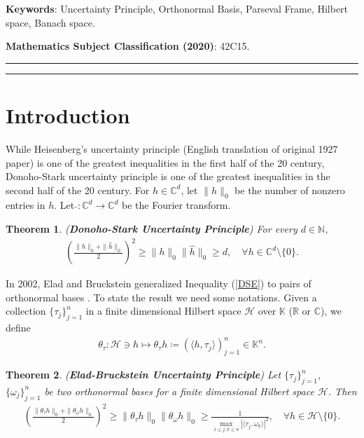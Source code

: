 \documentclass{amsart}
\newtheorem{theorem}{Theorem}[section]
\begin{document}
\textbf{Keywords}:   Uncertainty Principle, Orthonormal Basis, Parseval Frame, Hilbert space, Banach space.

\textbf{Mathematics Subject Classification (2020)}: 42C15.\\

\hrule


\hrule
\section{Introduction}
While Heisenberg's uncertainty principle \cite{HEISENBERG} (English translation of original 1927 paper) is one of the greatest inequalities in the first half of the 20 century, Donoho-Stark uncertainty principle \cite{DONOHOSTARK} is one of the greatest inequalities in the second half of the 20 century. For $h \in \mathbb{C}^d$, let $\|h\|_0$ be the number of nonzero entries in $h$. Let $\hat{}: \mathbb{C}^d \to  \mathbb{C}^d$ be the Fourier transform.
\begin{theorem} (\textbf{Donoho-Stark Uncertainty Principle}) \cite{DONOHOSTARK} \label{DS}
	For every $d\in \mathbb{N}$, 
	\begin{align}\label{DSE}
  \left(\frac{\|h\|_0+\|\widehat{h}\|_0}{2}\right)^2\geq \|h\|_0\|\widehat{h}\|_0	\geq d, \quad \forall h \in \mathbb{C}^d\setminus \{0\}.
	\end{align}
\end{theorem}
In 2002, Elad and Bruckstein generalized Inequality (\ref{DSE})  to pairs of orthonormal bases \cite{ELADBRUCKSTEIN}. To state the result we need some notations. Given a collection $\{\tau_j\}_{j=1}^n$ in a finite dimensional Hilbert space $\mathcal{H}$ over $\mathbb{K}$ ($\mathbb{R}$ or $\mathbb{C}$), we define 
\begin{align*}
	\theta_\tau: \mathcal{H} \ni h \mapsto \theta_\tau h \coloneqq (\langle h, \tau_j\rangle)_{j=1}^n \in \mathbb{K} ^n.
\end{align*}
\begin{theorem} (\textbf{Elad-Bruckstein Uncertainty Principle}) \cite{ELADBRUCKSTEIN} \label{EB}
	Let $\{\tau_j\}_{j=1}^n$,  $\{\omega_j\}_{j=1}^n$ be two orthonormal bases for a  finite dimensional Hilbert space $\mathcal{H}$. Then 
	\begin{align*}
	\left(\frac{\|\theta_\tau h\|_0+\|\theta_\omega h\|_0}{2}\right)^2	\geq \|\theta_\tau h\|_0\|\theta_\omega h\|_0\geq \frac{1}{\displaystyle\max_{1\leq j, k \leq n}|\langle\tau_j, \omega_k \rangle|^2}, \quad \forall h \in \mathcal{H}\setminus \{0\}.
	\end{align*}
\end{theorem}
\end{document}
